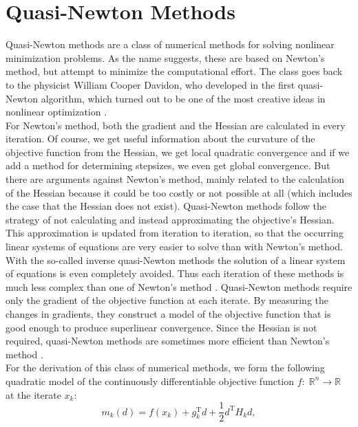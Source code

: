 \section{Quasi-Newton Methods}
\label{Section2.2}

Quasi-Newton methods are a class of numerical methods for solving nonlinear minimization problems. As the name suggests, these are based on Newton's method, but attempt to minimize the computational effort. The class goes back to the physicist William Cooper Davidon, who developed in \cite{Davidon:1959} the first quasi-Newton algorithm, which turned out to be one of the most creative ideas in nonlinear optimization \cite[p.~135]{NocedalWright:2006}. \\
For Newton's method, both the gradient and the Hessian are calculated in every iteration. Of course, we get useful information about the curvature of the objective function from the Hessian, we get local quadratic convergence and if we add a method for determining stepsizes, we even get global convergence. But there are arguments against Newton's method, mainly related to the calculation of the Hessian because it could be too costly or not possible at all (which includes the case that the Hessian does not exist). Quasi-Newton methods follow the strategy of not calculating and instead approximating the objective's Hessian. This approximation is updated from iteration to iteration, so that the occurring linear systems of equations are very easier to solve than with Newton's method. With the so-called inverse quasi-Newton methods the solution of a linear system of equations is even completely avoided. Thus each iteration of these methods is much less complex than one of Newton's method \cite[p.~129]{GeigerKanzow:1999}. Quasi-Newton methods require only the gradient of the objective function at each iterate. By measuring the changes in gradients, they construct a model of the objective function that is good enough to produce superlinear convergence. Since the Hessian is not required, quasi-Newton methods are sometimes more efficient than Newton's method \cite[p.~136]{NocedalWright:2006}. \\
For the derivation of this class of numerical methods, we form the following quadratic model of the continuously differentiable objective function $f \colon \; \mathbb{R}^n \to \mathbb{R}$ at the iterate $x_k$:
\begin{equation*}
    m_k(d) = f(x_k) + g^{\mathrm{T}}_k d + \frac{1}{2} d^{\mathrm{T}} H_k d,
\end{equation*}
